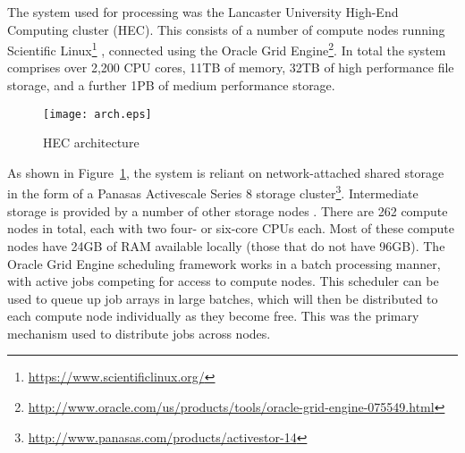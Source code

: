 The system used for processing was the Lancaster University High-End Computing cluster (HEC).  This consists of a number of compute nodes running Scientific Linux\footnote{\url{https://www.scientificlinux.org/}}%
, connected using the Oracle Grid Engine\footnote{\url{http://www.oracle.com/us/products/tools/oracle-grid-engine-075549.html}}.  
In total the system comprises over 2,200 CPU cores, 11TB of memory, 32TB of high performance file storage, and a further 1PB of medium performance storage.


\begin{figure}[h]
    \centering
    \texttt{[image: arch.eps]}
    \caption{HEC architecture}
    \label{fig:arch}
\end{figure}

As shown in Figure~\ref{fig:arch}, the system is reliant on network-attached shared storage in the form of a Panasas Activescale Series 8 storage cluster\footnote{\url{http://www.panasas.com/products/activestor-14}}\cite{Nagle2004PAS1048933.1049998}.  Intermediate storage is provided by a number of other storage nodes .
There are 262 compute nodes in total, each with two four- or six-core CPUs  each.  Most of these compute nodes have 24GB of RAM available locally (those that do not have 96GB).
The Oracle Grid Engine scheduling framework works in a batch processing manner, with active jobs competing for access to compute nodes.  This scheduler can be used to queue up job arrays in large batches, which will then be distributed to each compute node individually as they become free.  This was the primary mechanism used to distribute jobs across nodes.

